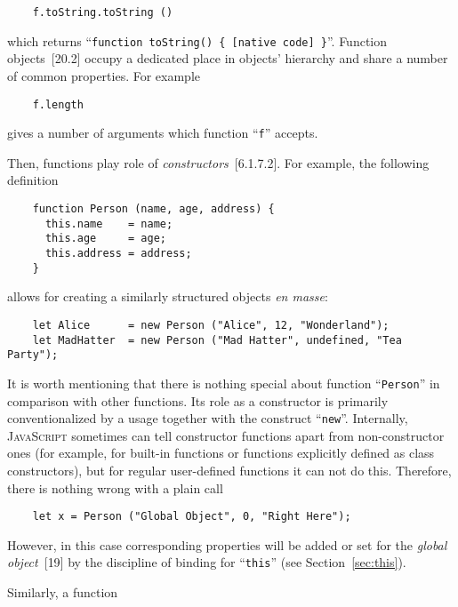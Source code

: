 \documentclass{article}
\newcommand{\js}{\textsc{JavaScript}\xspace}
\newcommand{\rf}[1]{[\textsc{#1}]}
\begin{document}
\begin{lstlisting}
    f.toString.toString ()
\end{lstlisting}

which returns ``\lstinline|function toString() { [native code] }|''. Function objects~\rf{20.2} occupy a dedicated place in objects' hierarchy
and share a number of common properties. For example

\begin{lstlisting}
    f.length
\end{lstlisting}

gives a number of arguments which function ``\lstinline|f|'' accepts.

Then, functions play role of \emph{constructors}~\rf{6.1.7.2}. For example, the following definition

\begin{lstlisting}
    function Person (name, age, address) {
      this.name    = name;
      this.age     = age;
      this.address = address;
    }
\end{lstlisting}

allows for creating a similarly structured objects \emph{en masse}:

\begin{lstlisting}
    let Alice      = new Person ("Alice", 12, "Wonderland");
    let MadHatter  = new Person ("Mad Hatter", undefined, "Tea Party");  
\end{lstlisting}

It is worth mentioning that there is nothing special about function ``\lstinline|Person|'' in
comparison with other functions. Its role as a constructor is primarily conventionalized
by a usage together with the construct ``\lstinline|new|''. Internally, \js sometimes can
tell constructor functions apart from non-constructor ones (for example, for built-in functions or
functions explicitly defined as class constructors), but for regular user-defined functions
it can not do this. Therefore, there is nothing wrong with a plain call

\begin{lstlisting}
    let x = Person ("Global Object", 0, "Right Here");
\end{lstlisting}

However, in this case corresponding properties will be added or set for the \emph{global object}~\rf{19} by
the discipline of binding for ``\lstinline|this|'' (see Section~\ref{sec:this}).

Similarly, a function
\end{document}
